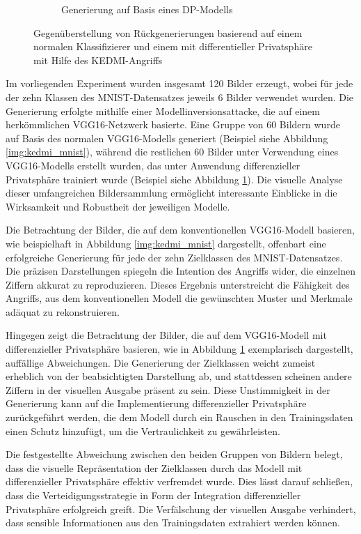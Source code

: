 \begin{figure}[H]
\begin{subfigure}[b]{0.35\linewidth}
		\caption{Generierung auf Basis eines DP-Modells}
		\label{img:kedmi_mnist_dp}
	\end{subfigure}
	\caption{Gegenüberstellung von Rückgenerierungen basierend auf einem normalen Klassifizierer und einem mit differentieller Privatsphäre mit Hilfe des \glqq KEDMI\grqq-Angriffs}
	\label{img:kedmi_dpvsnorm}
\end{figure}

Im vorliegenden Experiment wurden insgesamt 120 Bilder erzeugt, wobei für jede der zehn Klassen des MNIST-Datensatzes jeweils 6 Bilder verwendet wurden. Die Generierung erfolgte mithilfe einer Modellinversionsattacke, die auf einem herkömmlichen VGG16-Netzwerk basierte. Eine Gruppe von 60 Bildern wurde auf Basis des normalen VGG16-Modells generiert (Beispiel siehe Abbildung \ref{img:kedmi_mnist}), während die restlichen 60 Bilder unter Verwendung eines VGG16-Modells erstellt wurden, das unter Anwendung differenzieller Privatsphäre trainiert wurde (Beispiel siehe Abbildung \ref{img:kedmi_mnist_dp}). Die visuelle Analyse dieser umfangreichen Bildersammlung ermöglicht interessante Einblicke in die Wirksamkeit und Robustheit der jeweiligen Modelle.

Die Betrachtung der Bilder, die auf dem konventionellen VGG16-Modell basieren, wie beispielhaft in Abbildung \ref{img:kedmi_mnist} dargestellt, offenbart eine erfolgreiche Generierung für jede der zehn Zielklassen des MNIST-Datensatzes. Die präzisen Darstellungen spiegeln die Intention des Angriffs wider, die einzelnen Ziffern akkurat zu reproduzieren. Dieses Ergebnis unterstreicht die Fähigkeit des Angriffs, aus dem konventionellen Modell die gewünschten Muster und Merkmale adäquat zu rekonstruieren.

Hingegen zeigt die Betrachtung der Bilder, die auf dem VGG16-Modell mit differenzieller Privatsphäre basieren, wie in Abbildung \ref{img:kedmi_mnist_dp} exemplarisch dargestellt, auffällige Abweichungen. Die Generierung der Zielklassen weicht zumeist erheblich von der beabsichtigten Darstellung ab, und stattdessen scheinen andere Ziffern in der visuellen Ausgabe präsent zu sein. Diese Unstimmigkeit in der Generierung kann auf die Implementierung differenzieller Privatsphäre zurückgeführt werden, die dem Modell durch ein Rauschen in den Trainingsdaten einen Schutz hinzufügt, um die Vertraulichkeit zu gewährleisten.

Die festgestellte Abweichung zwischen den beiden Gruppen von Bildern belegt, dass die visuelle Repräsentation der Zielklassen durch das Modell mit differenzieller Privatsphäre effektiv verfremdet wurde. Dies lässt darauf schließen, dass die Verteidigungsstrategie in Form der Integration differenzieller Privatsphäre erfolgreich greift. Die Verfälschung der visuellen Ausgabe verhindert, dass sensible Informationen aus den Trainingsdaten extrahiert werden können.

